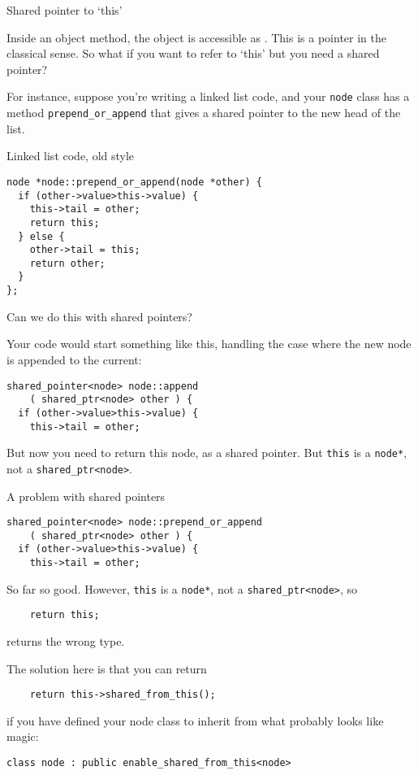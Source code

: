  {Shared pointer to `this'}

Inside an object method, the object is accessible as
. This is a pointer in the classical sense. So what
if you want to refer to `this' but you need a shared pointer?

For instance, suppose you're writing a linked list code, and your
\lstinline{node} class has a method \lstinline{prepend_or_append} that gives a shared
pointer to the new head of the list.

\begin{slide}{Linked list code, old style}
  \label{sl:share-ptr-node}  
\begin{lstlisting}
node *node::prepend_or_append(node *other) {
  if (other->value>this->value) {
    this->tail = other;
    return this;
  } else {
    other->tail = this;
    return other;
  }
};
\end{lstlisting}
Can we do this with shared pointers?
\end{slide}

Your code would start something
like this, handling the case where the new node is appended to the current:
\begin{lstlisting}
shared_pointer<node> node::append
    ( shared_ptr<node> other ) {
  if (other->value>this->value) {
    this->tail = other;
\end{lstlisting}
But now you need to return this node, as a shared pointer. But
\lstinline{this} is a \lstinline{node*}, not a \lstinline{shared_ptr<node>}.

\begin{slide}{A problem with shared pointers}
  \label{sl:share-ptr-node-sh}
\begin{lstlisting}
shared_pointer<node> node::prepend_or_append
    ( shared_ptr<node> other ) {
  if (other->value>this->value) {
    this->tail = other;
\end{lstlisting}
So far so good. However, \lstinline{this} is a \lstinline{node*}, not a
\lstinline{shared_ptr<node>}, so
\begin{lstlisting}
    return this;
\end{lstlisting}
returns the wrong type.
\end{slide}

The solution here is that you can return
\begin{lstlisting}
    return this->shared_from_this();
\end{lstlisting}
if you have defined your node class to inherit from what probably
looks like magic:
\begin{lstlisting}
class node : public enable_shared_from_this<node>
\end{lstlisting}

